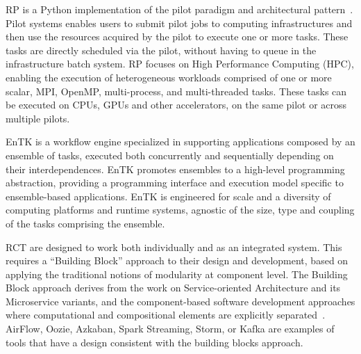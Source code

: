 \documentclass[preprint,12pt, a4paper]{elsarticle}
\begin{document}
RP is a Python implementation of the pilot paradigm and architectural
pattern~\cite{turilli2018comprehensive}. Pilot systems enables users to
submit pilot jobs to computing infrastructures and then use the resources
acquired by the pilot to execute one or more tasks. These tasks are directly
scheduled via the pilot, without having to queue in the infrastructure batch
system. RP focuses on High Performance Computing (HPC), enabling the
execution of heterogeneous workloads comprised of one or more scalar, MPI,
OpenMP, multi-process, and multi-threaded tasks. These tasks can be executed
on CPUs, GPUs and other accelerators, on the same pilot or across multiple
pilots.

EnTK is a workflow engine specialized in supporting applications composed by
an ensemble of tasks, executed both concurrently and sequentially depending
on their interdependences. EnTK promotes ensembles to a high-level
programming abstraction, providing a programming interface and execution
model specific to ensemble-based applications. EnTK is engineered for scale
and a diversity of computing platforms and runtime systems, agnostic of the
size, type and coupling of the tasks comprising the ensemble.


RCT are designed to work both individually and as an integrated system. This
requires a ``Building Block'' approach to their design and development, based
on applying the traditional notions of modularity at component level. The
Building Block approach derives from the work on Service-oriented
Architecture and its Microservice variants, and the component-based software
development approaches where computational and compositional elements are
explicitly
separated~\cite{batory1992design,garlan1995architectural,lenz1988software,clemens1998component,schneider2000components}.
AirFlow, Oozie, Azkaban, Spark Streaming, Storm, or Kafka are examples of
tools that have a design consistent with the building blocks approach.
\end{document}

